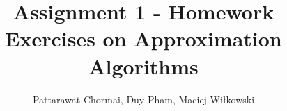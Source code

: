 \documentclass[12pt]{article}
\begin{document}
\title{Assignment 1 - Homework Exercises on Approximation Algorithms}
\author{Pattarawat Chormai, Duy Pham, Maciej Wiłkowski}
\maketitle








\end{document}
